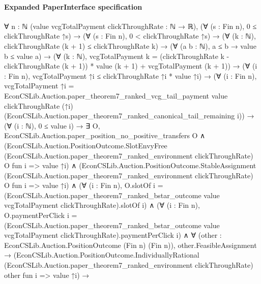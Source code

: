 \documentclass[10pt]{article}
\begin{document}
\paragraph{Expanded PaperInterface specification}
\begin{ReviewVerbatim}
∀ {n : ℕ} (value vcgTotalPayment clickThroughRate : ℕ → ℝ),
  (∀ (s : Fin n), 0 ≤ clickThroughRate ↑s) →
    (∀ (s : Fin n), 0 < clickThroughRate ↑s) →
      (∀ (k : ℕ), clickThroughRate (k + 1) ≤ clickThroughRate k) →
        (∀ (a b : ℕ), a ≤ b → value b ≤ value a) →
          (∀ (k : ℕ),
              vcgTotalPayment k =
                (clickThroughRate k - clickThroughRate (k + 1)) * value (k + 1) + vcgTotalPayment (k + 1)) →
            (∀ (i : Fin n), vcgTotalPayment ↑i ≤ clickThroughRate ↑i * value ↑i) →
              (∀ (i : Fin n),
                  vcgTotalPayment ↑i =
                    EconCSLib.Auction.paper_theorem7_ranked_vcg_tail_payment value clickThroughRate (↑i)
                      (EconCSLib.Auction.paper_theorem7_ranked_canonical_tail_remaining i)) →
                (∀ (i : ℕ), 0 ≤ value i) →
                  ∃ O,
                    EconCSLib.Auction.paper_position_no_positive_transfers O ∧
                      (EconCSLib.Auction.PositionOutcome.SlotEnvyFree
                          (EconCSLib.Auction.paper_theorem7_ranked_environment clickThroughRate) O fun i => value ↑i) ∧
                        (EconCSLib.Auction.PositionOutcome.StableAssignment
                            (EconCSLib.Auction.paper_theorem7_ranked_environment clickThroughRate) O fun i =>
                            value ↑i) ∧
                          (∀ (i : Fin n),
                              O.slotOf i =
                                (EconCSLib.Auction.paper_theorem7_ranked_bstar_outcome value vcgTotalPayment
                                      clickThroughRate).slotOf
                                  i) ∧
                            (∀ (i : Fin n),
                                O.paymentPerClick i =
                                  (EconCSLib.Auction.paper_theorem7_ranked_bstar_outcome value vcgTotalPayment
                                        clickThroughRate).paymentPerClick
                                    i) ∧
                              ∀ (other : EconCSLib.Auction.PositionOutcome (Fin n) (Fin n)),
                                other.FeasibleAssignment →
                                  (EconCSLib.Auction.PositionOutcome.IndividuallyRational
                                      (EconCSLib.Auction.paper_theorem7_ranked_environment clickThroughRate) other
                                      fun i => value ↑i) →

\end{ReviewVerbatim}
\end{document}
